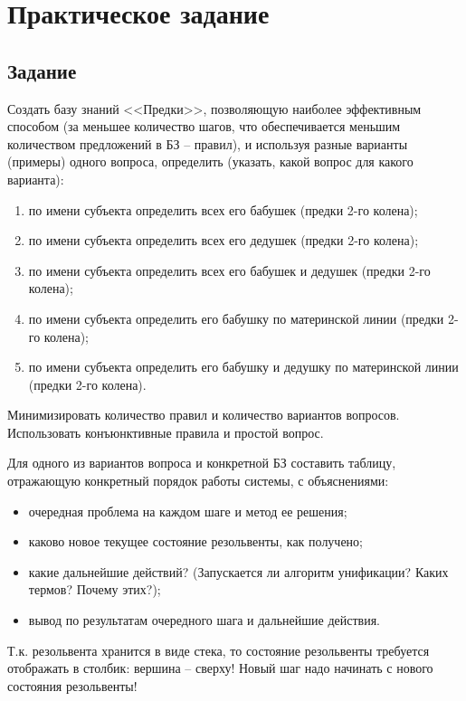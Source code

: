 \documentclass[14pt,a4paper]{scrreprt}
\begin{document}


\thispagestyle{empty}

\chapter{Практическое задание}

\section{Задание}

Создать базу знаний <<Предки>>, позволяющую наиболее эффективным способом (за меньшее количество шагов, что обеспечивается меньшим количеством предложений в БЗ -- правил), и используя разные варианты (примеры) одного вопроса, определить (указать, какой вопрос для какого варианта):
\begin{enumerate}
	\item по имени субъекта определить всех его бабушек (предки 2-го колена);
	\item по имени субъекта определить всех его дедушек (предки 2-го колена);
	\item по имени субъекта определить всех его бабушек и дедушек (предки 2-го колена);
	\item по имени субъекта определить его бабушку по материнской линии (предки 2-го колена);
	\item по имени субъекта определить его бабушку и дедушку по материнской линии (предки 2-го колена).
\end{enumerate}
Минимизировать количество правил и количество вариантов вопросов. Использовать конъюнктивные правила и простой вопрос.

Для одного из вариантов вопроса и конкретной БЗ составить таблицу, отражающую конкретный порядок работы системы, с объяснениями:
\begin{itemize}
	\item очередная проблема на каждом шаге и метод ее решения;
	\item каково новое текущее состояние резольвенты, как получено;
	\item какие дальнейшие действий? (Запускается ли алгоритм унификации? Каких термов? Почему этих?);
	\item вывод по результатам очередного шага и дальнейшие действия.
\end{itemize}
Т.к. резольвента хранится в виде стека, то состояние резольвенты требуется отображать в столбик: вершина -- сверху! Новый шаг надо начинать с нового состояния резольвенты!
\end{document}
